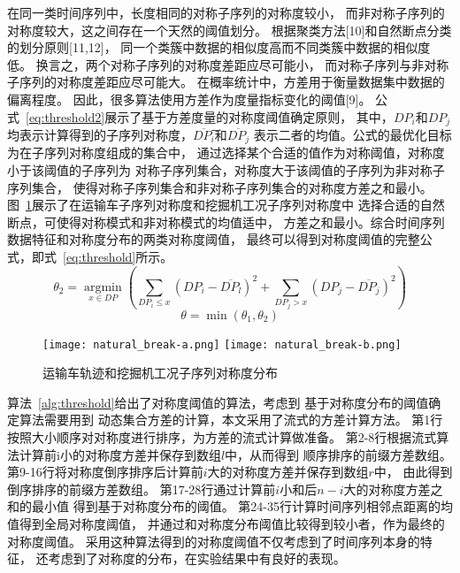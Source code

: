 在同一类时间序列中，长度相同的对称子序列的对称度较小，
而非对称子序列的对称度较大，这之间存在一个天然的阈值划分。
根据聚类方法[10]和自然断点分类的划分原则[11,12]，
同一个类簇中数据的相似度高而不同类簇中数据的相似度低。
换言之，两个对称子序列的对称度差距应尽可能小，
而对称子序列与非对称子序列的对称度差距应尽可能大。
在概率统计中，方差用于衡量数据集中数据的偏离程度。
因此，很多算法使用方差作为度量指标变化的阈值[9]。
公式~\ref{eq:threshold2}展示了基于方差度量的对称度阈值确定原则，
其中，$DP_i$和$DP_j$均表示计算得到的子序列对称度，$\overline{DP_{i}}$̅和$\overline{DP_{j}}$
表示二者的均值。公式的最优化目标为在子序列对称度组成的集合中，
通过选择某个合适的值作为对称阈值，对称度小于该阈值的子序列为
对称子序列集合，对称度大于该阈值的子序列为非对称子序列集合，
使得对称子序列集合和非对称子序列集合的对称度方差之和最小。
图~\ref{fig:natural_break}展示了在运输车子序列对称度和挖掘机工况子序列对称度中
选择合适的自然断点，可使得对称模式和非对称模式的均值适中，
方差之和最小。综合时间序列数据特征和对称度分布的两类对称度阈值，
最终可以得到对称度阈值的完整公式，即式~\ref{eq:threshold}所示。
\begin{equation}
  \theta_{2}=\underset{x \in D P}{\operatorname{argmin}}\left(\sum_{D P_{i} \leq x}\left(D P_{i}-\overline{D P_{l}}\right)^{2}+\sum_{D P_{j}>x}\left(D P_{j}-\overline{D P_{j}}\right)^{2}\right)
  \label{eq:threshold2}
\end{equation}
\begin{equation}
  \theta=\min \left(\theta_{1}, \theta_{2}\right)
  \label{eq:threshold}
\end{equation}
\begin{figure}
  \centering
  {\texttt{[image: natural\_break-a.png]}}
  {\texttt{[image: natural\_break-b.png]}}
  \caption{运输车轨迹和挖掘机工况子序列对称度分布}
  \label{fig:natural_break}
\end{figure}

算法~\ref{alg:threshold}给出了对称度阈值的算法，考虑到
基于对称度分布的阈值确定算法需要用到
动态集合方差的计算，本文采用了流式的方差计算方法。
第1行按照大小顺序对对称度进行排序，为方差的流式计算做准备。
第2-8行根据流式算法计算前i小的对称度方差并保存到数组$l$中，从而得到
顺序排序的前缀方差数组。
第9-16行将对称度倒序排序后计算前$i$大的对称度方差并保存到数组$r$中，
由此得到倒序排序的前缀方差数组。
第17-28行通过计算前$i$小和后$n-i$大的对称度方差之和的最小值
得到基于对称度分布的阈值。
第24-35行计算时间序列相邻点距离的均值得到全局对称度阈值，
并通过和对称度分布阈值比较得到较小者，作为最终的对称度阈值。
采用这种算法得到的对称度阈值不仅考虑到了时间序列本身的特征，
还考虑到了对称度的分布，在实验结果中有良好的表现。


